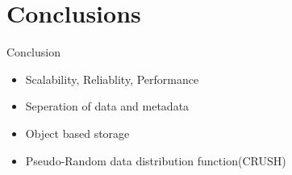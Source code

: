 \section{Conclusions}

\begin{frame}{Conclusion}
    \begin{itemize}
        \item Scalability, Reliablity, Performance
        \item Seperation of data and metadata
        \item Object based storage
        \item Pseudo-Random data distribution function(CRUSH)
    \end{itemize}
\end{frame}
